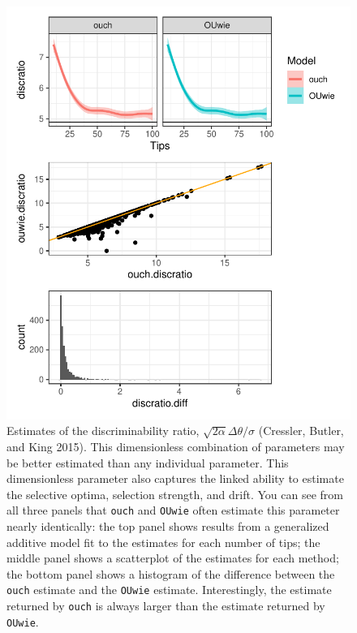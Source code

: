 \documentclass[12pt,reqno,final]{amsart}\usepackage[]{graphicx}\usepackage[]{color}
\makeatletter
\def\maxwidth{ %
  \ifdim\Gin@nat@width>\linewidth
    \linewidth
  \else
    \Gin@nat@width
  \fi
}
\newenvironment{kframe}{%
 \def\at@end@of@kframe{}%
 \ifinner\ifhmode%
  \def\at@end@of@kframe{\end{minipage}}%
  \begin{minipage}{\columnwidth}%
 \fi\fi%
 \def\FrameCommand##1{\hskip\@totalleftmargin \hskip-\fboxsep
 \colorbox{shadecolor}{##1}\hskip-\fboxsep
     \hskip-\linewidth \hskip-\@totalleftmargin \hskip\columnwidth}%
 \MakeFramed {\advance\hsize-\width
   \@totalleftmargin\z@ \linewidth\hsize
   \@setminipage}}%
 {\par\unskip\endMakeFramed%
 \at@end@of@kframe}
\newenvironment{knitrout}{}{} %
\theoremstyle{plain}
\numberwithin{equation}{part}
\makeatother
\begin{document}
\begin{knitrout}
\color{fgcolor}\begin{kframe}


{\ttfamily\noindent\itshape{}}\end{kframe}\begin{figure}
\includegraphics[width=\maxwidth]{figure/unnamed-chunk-2-1} \caption{Estimates of the discriminability ratio, $\sqrt{2\alpha}\Delta\theta/\sigma$ (Cressler, Butler, and King 2015). This dimensionless combination of parameters may be better estimated than any individual parameter. This dimensionless parameter also captures the linked ability to estimate the selective optima, selection strength, and drift. You can see from all three panels that \texttt{ouch} and \texttt{OUwie} often estimate this parameter nearly identically: the top panel shows results from a generalized additive model fit to the estimates for each number of tips; the middle panel shows a scatterplot of the estimates for each method; the bottom panel shows a histogram of the difference between the \texttt{ouch} estimate and the \texttt{OUwie} estimate. Interestingly, the estimate returned by \texttt{ouch} is always larger than the estimate returned by \texttt{OUwie}.}\label{fig:unnamed-chunk-2}
\end{figure}


\end{knitrout}
\end{document}
